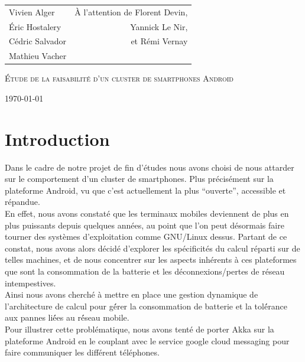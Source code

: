 \documentclass[a4paper,12pt]{article}
\begin{document}
\begin{titlepage}

\addtolength{\oddsidemargin}{-0.15in}
\addtolength{\textwidth}{0.5in}
\addtolength{\topmargin}{-.375in}
\addtolength{\textheight}{0.75in}

\begin{center}

\begin{tabular*}{6in}{l@{\extracolsep{\fill}}r}{Vivien Alger}&{À
    l'attention de Florent Devin,}\\
    {Éric Hostalery}&{Yannick Le Nir,}\\
    {Cédric Salvador}&{et Rémi Vernay}\\
    {Mathieu Vacher}
\end{tabular*}
\vspace*{\fill}

\textsc{\LARGE Étude de la faisabilité
d'un cluster de smartphones Android}\\
\vspace*{\fill}

\today
\end{center}

\end{titlepage}

\tableofcontents
\newpage

\pagestyle{fancy}
\fancyhf{}
\fancyhead[R]{\thepage}
\renewcommand{\footrulewidth}{1pt}
\renewcommand{\headrulewidth}{1pt}
  
\section*{Introduction}
Dans le cadre de notre projet de fin d’études nous avons choisi de nous
attarder sur le comportement d’un cluster de smartphones. Plus précisément sur
la plateforme Android, vu que c’est actuellement la plus “ouverte”, accessible
et répandue.\\ En effet, nous avons constaté que les terminaux mobiles
deviennent de plus en plus puissants depuis quelques années, au point que l’on
peut désormais faire tourner des systèmes d’exploitation comme GNU/Linux
dessus. Partant de ce constat, nous avons alors décidé d’explorer les
spécificités du calcul réparti sur de telles machines, et de nous concentrer
sur les aspects inhérents à ces plateformes que sont la consommation de la
batterie et les déconnexions/pertes de réseau intempestives.\\ Ainsi nous avons
cherché à mettre en place une gestion dynamique de l’architecture de calcul
pour gé́rer la consommation de batterie et la tolé́rance aux pannes lié́es au
ré́seau mobile.\\ Pour illustrer cette problématique, nous avons tenté de porter
Akka sur la plateforme Android en le couplant avec le service google cloud
messaging pour faire communiquer les différent téléphones.
\end{document}
